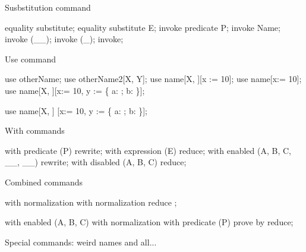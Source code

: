 Susbstitution command

\begin{zproof}[substCmd]
equality substitute;
equality substitute E;
invoke predicate P;
invoke Name;
invoke (\_\rel\_);
invoke (\seq\_);
invoke;
\end{zproof}

Use command

\begin{zproof}[useCmd]
use otherName;
use otherName2[X, Y];
use name[X, \power \nat][x := 10];
use name[x:= 10];
use name[X, \power \nat][x:= 10,
  y := \{ a: \nat; b: \nat \}];

use name[X, \power \nat]
[x:= 10,
  y := \{ a: \nat; b: \nat \}];
\end{zproof}

With commands

\begin{zproof}[withCmds]
with predicate (P) rewrite;
with expression (E) reduce;
with enabled (A, B, C, \_\rel\_, \_\fun\_) rewrite;
with disabled (A, B, C) reduce;
\end{zproof}

Combined commands

\begin{zproof}[combinedCmd1]
with normalization
      with
          normalization
              reduce
      ;           %

with enabled (A, B, C)
  with normalization
    with predicate (P)
      prove by reduce;
\end{zproof}


Special commands: weird names and all...


